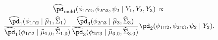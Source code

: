 \begin{multline}
  \widehat{\pd}_{\text{meld}} (\phi_{1 \cap 2}, \phi_{2 \cap 3}, \psi_{2} \mid Y_{1}, Y_{2}, Y_{3})
  \, \propto \, \\
  \frac {
    \widehat{\pd}_{1}(\phi_{1 \cap 2} \mid \widehat{\mu}_{1}, \widehat{\Sigma}_{1})
  } {
    \widehat{\pd}_{1}(\phi_{1 \cap 2} \mid \widehat{\mu}_{1, 0}, \widehat{\Sigma}_{1, 0})
  }
  \frac {
    \widehat{\pd}_{3}(\phi_{2 \cap 3} \mid \widehat{\mu}_{3}, \widehat{\Sigma}_{3})
  } {
    \widehat{\pd}_{3}(\phi_{2 \cap 3} \mid \widehat{\mu}_{3, 0}, \widehat{\Sigma}_{3, 0})
  }
  \pd_{2}(\phi_{1 \cap 2}, \phi_{2 \cap 3}, \psi_{2} \mid Y_{2}).
  \label{eqn:normal-approximation-approximate-target}
\end{multline}
